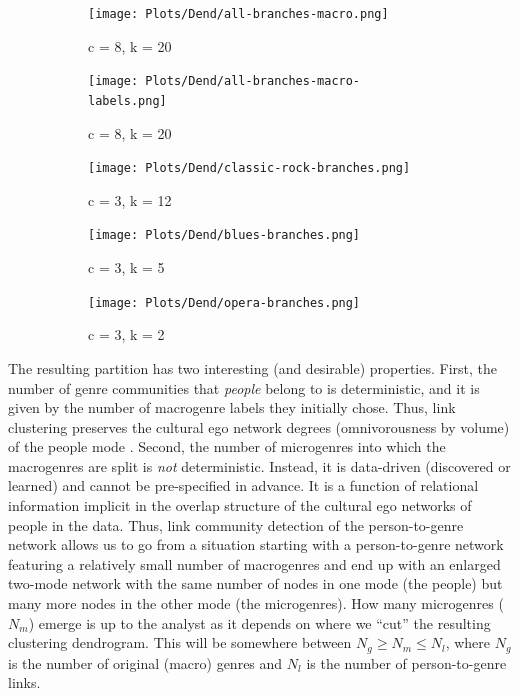 \documentclass[a4paper,12pt]{extarticle}
\begin{document}
\begin{figure}[t!]
     \begin{subfigure}[b]{0.5\textwidth}
        \centering
        \texttt{[image: Plots/Dend/all-branches-macro.png]}
        \caption{c = 8, k = 20}
        \label{fig:dend-macro}
    \end{subfigure} 
     \begin{subfigure}[b]{0.5\textwidth}
        \centering
        \texttt{[image: Plots/Dend/all-branches-macro-labels.png]}
        \caption{c = 8, k = 20}
        \label{fig:dend-macro-labels}
    \end{subfigure} 
     \begin{subfigure}[b]{0.32\textwidth}
        \centering
        \texttt{[image: Plots/Dend/classic-rock-branches.png]}
        \caption{c = 3, k = 12}
        \label{fig:dend-micro-classic-rock}
    \end{subfigure} 
     \begin{subfigure}[b]{0.32\textwidth}
        \centering
        \texttt{[image: Plots/Dend/blues-branches.png]}
        \caption{c = 3, k = 5}
        \label{fig:dend-micro-blues}
    \end{subfigure}
     \begin{subfigure}[b]{0.32\textwidth}
        \centering
        \texttt{[image: Plots/Dend/opera-branches.png]}
        \caption{c = 3, k = 2}
        \label{fig:dend-micro-opera}
    \end{subfigure}
    \caption{}
    \label{fig:dend}
 \end{figure}
 
The resulting partition has two interesting (and desirable) properties. First, the number of genre communities that \textit{people} belong to is deterministic, and it is given by the number of macrogenre labels they initially chose. Thus, link clustering preserves the cultural ego network degrees (omnivorousness by volume) of the people mode \citep{lizardo14}. Second, the number of microgenres into which the macrogenres are split is {\em not} deterministic. Instead, it is data-driven (discovered or learned) and cannot be pre-specified in advance. It is a function of relational information implicit in the overlap structure of the cultural ego networks of people in the data. Thus, link community detection of the person-to-genre network allows us to go from a situation starting with a person-to-genre network featuring a relatively small number of macrogenres and end up with an enlarged two-mode network with the same number of nodes in one mode (the people) but many more nodes in the other mode (the microgenres). How many microgenres ($N_m$) emerge is up to the analyst as it depends on where we ``cut'' the resulting clustering dendrogram. This will be somewhere between $N_g \geq N_m \leq N_l$, where $N_g$ is the number of original (macro) genres and $N_l$ is the number of person-to-genre links.
\end{document}
